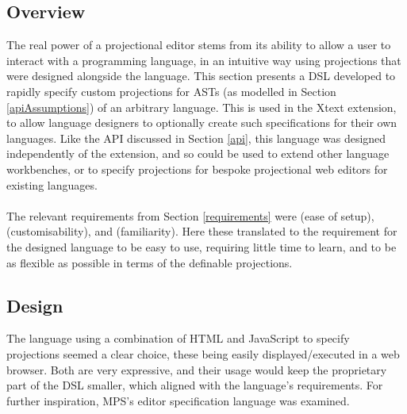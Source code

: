 \documentclass{article}
\begin{document}
{\subsection{Overview}
The real power of a projectional editor stems from its ability to allow a user to interact with a programming language, in an intuitive way using projections that were designed alongside the language. This section presents a DSL developed to rapidly specify custom projections for ASTs (as modelled in Section \ref{apiAssumptions}) of an arbitrary language. This is used in the Xtext extension, to allow language designers to optionally create such specifications for their own languages. Like the API discussed in Section \ref{api}, this language was designed independently of the extension, and so could be used to extend other language workbenches, or to specify projections for bespoke projectional web editors for existing languages.
\\
\\
The relevant requirements from Section \ref{requirements} were \RSetup (ease of setup), \RCustom (customisability), and \RFamiliarity (familiarity). Here these translated to the requirement for the designed language to be easy to use, requiring little time to learn, and to be as flexible as possible in terms of the definable projections.

\subsection{Design}

The language using a combination of HTML and JavaScript to specify projections seemed a clear choice, these being easily displayed/executed in a web browser. Both are very expressive, and their usage would keep the proprietary part of the DSL smaller, which aligned with the language's requirements. For further inspiration, MPS's editor specification language was examined.

}
\end{document}
